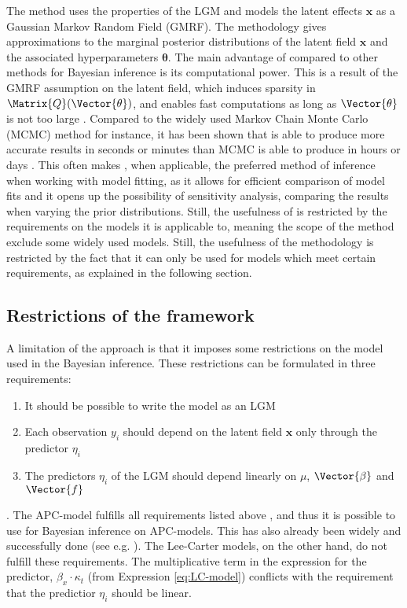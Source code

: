 \newpar The \inla method uses the properties of the LGM and models the latent effects $\mathbf{x}$ as a Gaussian Markov Random Field (GMRF). The methodology gives approximations to the marginal posterior distributions of the latent field $\mathbf{x}$ and the associated hyperparameters $\boldsymbol{\theta}$. The main advantage of \inla compared to other methods for Bayesian inference is its computational power. This is a result of the GMRF assumption on the latent field, which induces sparsity in $\Matrix{Q}(\Vector{\theta})$, and enables fast computations as long as $\Vector{\theta}$ is not too large \parencite{martinoRiebler2019}. Compared to the widely used Markov Chain Monte Carlo (MCMC) method for instance, it has been shown that \inla is able to produce more accurate results in seconds or minutes than MCMC is able to produce in hours or days \parencite{rue2009inla}.
This often makes \inla, when applicable, the preferred method of inference when working with model fitting, as it allows for efficient comparison of model fits and it opens up the possibility of sensitivity analysis, comparing the results when varying the prior distributions. Still, the usefulness of \inla is restricted by the requirements on the models it is applicable to, meaning the scope of the \inla method exclude some widely used models. Still, the usefulness of the \inla methodology is restricted by the fact that it can only be used for models which meet certain requirements, as explained in the following section.

\subsection{Restrictions of the \inla framework}
\label{sec:InlaRestrictions}
A limitation of the \inla approach is that it imposes some restrictions on the model used in the Bayesian inference. These restrictions can be formulated in three requirements:
\begin{enumerate}
    \item It should be possible to write the model as an LGM
    \item Each observation $y_i$ should depend on the latent field $\textbf{x}$ only through the predictor $\eta_i$ 
    \item The predictors $\eta_i$ of the LGM should depend linearly on $\mu$, $\Vector{\beta}$ and $\Vector{f}$
    \label{item:inlaRequirements}
\end{enumerate}
\parencite{martinoRiebler2019}.
\newpar The APC-model fulfills all requirements listed above \parencite{rieblerHeld2010}, and thus it is possible to use \inla for Bayesian inference on APC-models. This has also already been widely and successfully done (see e.g. \textcite{RieblerThesis2010}). The Lee-Carter models, on the other hand, do not fulfill these requirements. The multiplicative term in the expression for the predictor, $\beta_x\cdot \kappa_t$ (from Expression \ref{eq:LC-model}) conflicts with the requirement that the predictior $\eta_i$ should be linear.  
   
